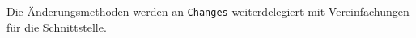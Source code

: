 Die Änderungsmethoden werden an \verb#Changes# weiterdelegiert mit Vereinfachungen für die Schnittstelle.
